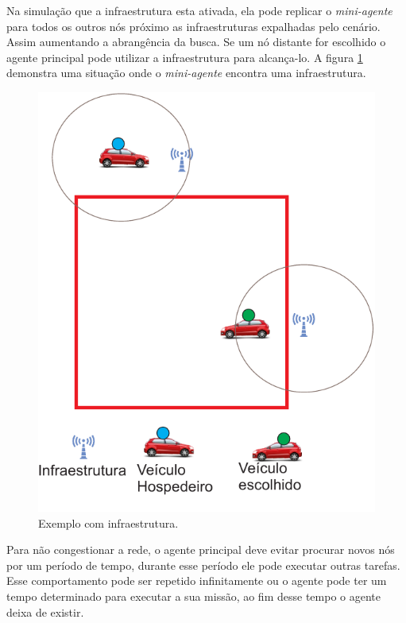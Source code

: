 Na simulação que a infraestrutura esta ativada, ela pode replicar o \emph{mini-agente} para todos os outros nós próximo as infraestruturas expalhadas pelo cenário. Assim aumentando a abrangência da busca. Se um nó distante for escolhido o agente principal pode utilizar a infraestrutura para alcança-lo. A figura \ref{fig:exemploComInfraestrutura} demonstra uma situação onde o \emph{mini-agente} encontra uma infraestrutura.

\begin{figure}[htbp]
	\centering
	\includegraphics[scale=0.5]{metodologia/figuras/exemploComInfraestrutura.pdf}
	\caption{Exemplo com infraestrutura.}
	\label{fig:exemploComInfraestrutura}
\end{figure}

Para não congestionar a rede, o agente principal deve evitar procurar novos nós por um período de tempo, durante esse período ele pode executar outras tarefas. Esse comportamento pode ser repetido infinitamente ou o agente pode ter um tempo determinado para executar a sua missão, ao fim desse tempo o agente deixa de existir.
